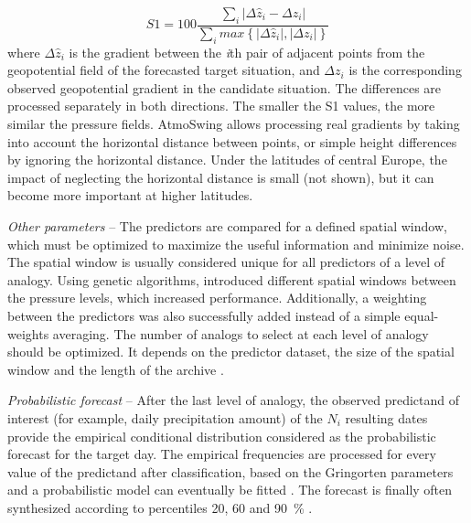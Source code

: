 \documentclass[gmdd]{copernicus}
\begin{document}
\begin{equation}
\label{eq:S1}
S1=100 \frac {\displaystyle \sum_{i} \vert \Delta\hat{z}_{i} - \Delta z_{i} \vert}
{\displaystyle \sum_{i} max\left\lbrace \vert \Delta\hat{z}_{i} \vert , \vert \Delta z_{i} \vert \right\rbrace }
\end{equation}
where $\Delta \hat{z}_{i}$ is the gradient between the \textit{i}th pair of adjacent points from the geopotential field of the forecasted target situation, and $\Delta z_{i}$ is the corresponding observed geopotential gradient in the candidate situation. The differences are processed separately in both directions. The smaller the S1 values, the more similar the pressure fields. AtmoSwing allows processing real gradients by taking into account the horizontal distance between points, or simple height differences by ignoring the horizontal distance. Under the latitudes of central Europe, the impact of neglecting the horizontal distance is small (not shown), but it can become more important at higher latitudes.

\textit{Other parameters} -- The predictors are compared for a defined spatial window, which must be optimized to maximize the useful information and minimize noise. The spatial window is usually considered unique for all predictors of a level of analogy. Using genetic algorithms, \citet{Horton2018a} introduced different spatial windows between the pressure levels, which increased performance. Additionally, a weighting between the predictors was also successfully added instead of a simple equal-weights averaging. The number of analogs to select at each level of analogy should be optimized. It depends on the predictor dataset, the size of the spatial window and the length of the archive \citep{Ruosteenoja1988, Vandendool1994}.

\textit{Probabilistic forecast} -- After the last level of analogy, the observed predictand of interest (for example, daily precipitation amount) of the $N_{i}$ resulting dates provide the empirical conditional distribution considered as the probabilistic forecast for the target day. The empirical frequencies are processed for every value of the predictand after classification, based on the Gringorten parameters \cite[for a Gumbel or exponential law; see][]{Gringorten1963} and a probabilistic model can eventually be fitted \citep[e.g. Gamma function,][]{Obled2002}. The forecast is finally often synthesized according to percentiles 20, 60 and 90~\% \citep{Guilbaud1997, Guilbaud1998}.
\end{document}
